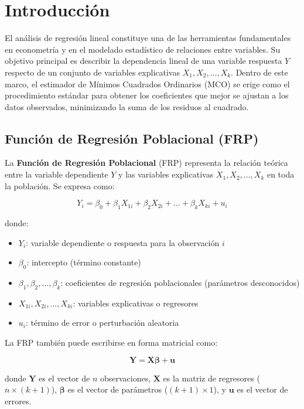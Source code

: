 \documentclass[11pt,a4paper]{article}
\begin{document}
\section{Introducción}

El análisis de regresión lineal constituye una de las herramientas fundamentales en econometría y en el modelado estadístico de relaciones entre variables. Su objetivo principal es describir la dependencia lineal de una variable respuesta \(Y\) respecto de un conjunto de variables explicativas \(X_1, X_2, \dots, X_k\). Dentro de este marco, el estimador de Mínimos Cuadrados Ordinarios (MCO) se erige como el procedimiento estándar para obtener los coeficientes que mejor se ajustan a los datos observados, minimizando la suma de los residuos al cuadrado.

\subsection{Función de Regresión Poblacional (FRP)}

\begin{definicion}[FRP]
La \textbf{Función de Regresión Poblacional} (FRP) representa la relación teórica entre la variable dependiente \(Y\) y las variables explicativas \(X_1, X_2, \dots, X_k\) en toda la población. Se expresa como:

\[
\boxed{Y_i = \beta_0 + \beta_1 X_{1i} + \beta_2 X_{2i} + \dots + \beta_k X_{ki} + u_i}
\]

donde:
\begin{itemize}
    \item \(Y_i\): variable dependiente o respuesta para la observación \(i\)
    \item \(\beta_0\): intercepto (término constante)
    \item \(\beta_1, \beta_2, \dots, \beta_k\): coeficientes de regresión poblacionales (parámetros desconocidos)
    \item \(X_{1i}, X_{2i}, \dots, X_{ki}\): variables explicativas o regresores
    \item \(u_i\): término de error o perturbación aleatoria
\end{itemize}

La FRP también puede escribirse en forma matricial como:

\[
\mathbf{Y} = \mathbf{X}\boldsymbol{\beta} + \mathbf{u}
\]

donde \(\mathbf{Y}\) es el vector de \(n\) observaciones, \(\mathbf{X}\) es la matriz de regresores (\(n \times (k+1)\)), \(\boldsymbol{\beta}\) es el vector de parámetros (\((k+1) \times 1\)), y \(\mathbf{u}\) es el vector de errores.
\end{definicion}
\end{document}
